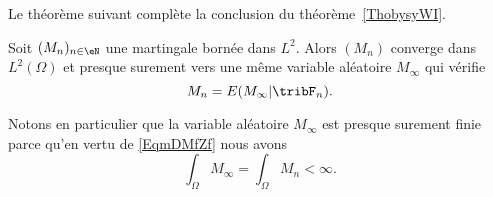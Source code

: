 Le théorème suivant complète la conclusion du théorème~\ref{ThobysyWI}.
\begin{theorem} \label{ThofcttYW}
	Soit \( (M_n)_{n\in \eN}\) une martingale bornée dans \( L^2\). Alors \( (M_n)\) converge dans \( L^2(\Omega)\) et presque surement vers une même variable aléatoire \( M_{\infty}\) qui vérifie
	\begin{equation}        \label{EqmDMfZf}
		M_n=E(M_{\infty}|\tribF_n).
	\end{equation}
\end{theorem}

Notons en particulier que la variable aléatoire \( M_{\infty}\) est presque surement finie parce qu'en vertu de \eqref{EqmDMfZf} nous avons
\begin{equation}
	\int_{\Omega}M_{\infty}=\int_{\Omega}M_n<\infty.
\end{equation}

